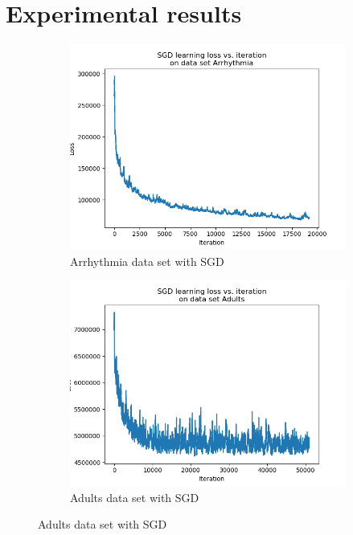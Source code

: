 \documentclass{article}
\begin{document}
\section{Experimental results}
\label{appendix-results}

\begin{figure}[H]
	\centering
	\begin{subfigure}[t]{0.45\linewidth}
		\includegraphics[width=\linewidth]{arrhythmia_sgd.png}
		\caption{Arrhythmia data set with SGD}
	\end{subfigure}
	\begin{subfigure}[t]{0.45\linewidth}
		\includegraphics[width=\linewidth]{adults_sgd.png}
		\caption{Adults data set with SGD}
	\end{subfigure}


\end{figure}
\end{document}
